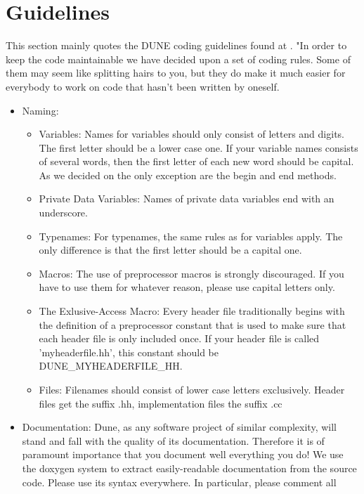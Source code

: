 \section{Guidelines} 

This section mainly quotes the DUNE coding guidelines found at \cite{DUNE-HP}.
"In order to keep the code maintainable we have decided upon a set of coding rules. 
Some of them may seem like splitting hairs to you, but they do make it much easier 
for everybody to work on code that hasn't been written by oneself.

\begin{itemize}
\item Naming: 
\begin{itemize}
\item Variables: Names for variables should only consist of letters and digits. The first letter should be a lower case one. If your variable names consists of several words, then the first letter of each new word should be capital. As we decided on the only exception are the begin and end methods.
\item Private Data Variables: Names of private data variables end with an underscore.
\item Typenames: For typenames, the same rules as for variables apply. The only difference is that the first letter should be a capital one.
\item Macros: The use of preprocessor macros is strongly discouraged. If you have to use them for whatever reason, please use capital letters only.
\item The Exlusive-Access Macro: Every header file traditionally begins with the definition of a preprocessor constant that is used to make sure that each header file is only included once. If your header file is called 'myheaderfile.hh', this constant should be DUNE\_MYHEADERFILE\_HH.
\item Files: Filenames should consist of lower case letters exclusively. Header files get the suffix .hh, implementation files the suffix .cc
\end{itemize}
\item Documentation:
      Dune, as any software project of similar complexity, will stand and fall with the quality of its documentation.
Therefore it is of paramount importance that you document well everything you do! We use the doxygen system to extract easily-readable documentation from the source code. Please use its syntax everywhere. In particular, please comment all
\begin{itemize}

\end{itemize}
\end{itemize}
